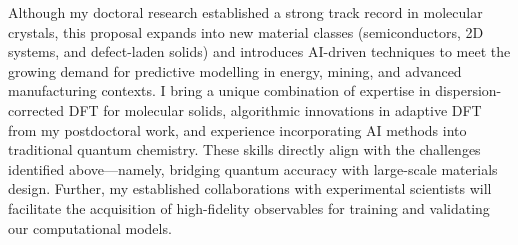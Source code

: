 \documentclass[11pt,english,calcwidth,compact]{nserc-appendix}
\begin{document}
Although my doctoral research established a strong track record in molecular crystals, this proposal expands into new material classes (semiconductors, 2D systems, and defect-laden solids) and introduces AI-driven techniques to meet the growing demand for predictive modelling in energy, mining, and advanced manufacturing contexts.
I bring a unique combination of expertise in dispersion-corrected DFT for molecular solids, algorithmic innovations in adaptive DFT from my postdoctoral work, and experience incorporating AI methods into traditional quantum chemistry. These skills directly align with the challenges identified above—namely, bridging quantum accuracy with large-scale materials design. Further, my established collaborations with experimental scientists will facilitate the acquisition of high-fidelity observables for training and validating our computational models.


\end{document}
